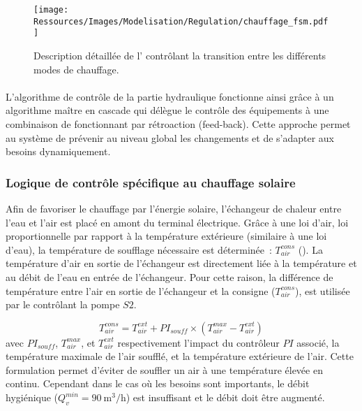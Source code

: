 \begin{figure}
    \centering
    \texttt{[image: Ressources/Images/Modelisation/Regulation/chauffage\_fsm.pdf]}
    \caption[ contrôlant la transition entre les différents modes de chauffage]
            {Description détaillée de l’ contrôlant la transition entre
             les différents modes de chauffage.}
    \label{fig:automate_chauffage}
\end{figure}


\paragraph{} %
\label{par:conclusion_algo}
L’algorithme de contrôle de la partie hydraulique fonctionne ainsi grâce à un algorithme
maître en cascade qui délègue le contrôle des équipements à une combinaison de
 fonctionnant par rétroaction (feed-back). Cette approche permet au système de
prévenir au niveau global les changements et de s’adapter aux besoins dynamiquement.


\subsubsection{Logique de contrôle spécifique au chauffage solaire} %
\label{ssub:logique_de_controle_specifique_au_chauffage_solaire}
Afin de favoriser le chauffage par l’énergie solaire, l’échangeur de chaleur entre l’eau
et l’air est placé en amont du terminal électrique. Grâce à une loi d’air, loi
proportionnelle par rapport à la température extérieure (similaire à une loi d’eau), la
température de soufflage nécessaire est déterminée~: $T_{air}^{cons}$ ().
La température d’air en sortie de l’échangeur est directement liée à la température et au
débit de l’eau en entrée de l’échangeur. Pour cette raison, la différence de température
entre l’air en sortie de l’échangeur et la consigne ($T_{air}^{cons}$), est utilisée
par le  contrôlant la pompe $S2$.

\begin{equation}\label{eq:temp_soufflage}
    T_{air}^{cons} = T_{air}^{ext} + PI_{souff} \times (T_{air}^{max} - T_{air}^{ext})
\end{equation}
avec $PI_{souff}$, $T_{air}^{max}$, et $T_{air}^{ext}$ respectivement l’impact du
contrôleur $PI$ associé, la température maximale de l’air soufflé, et la température
extérieure de l’air. Cette formulation permet d’éviter de souffler un air à une
température élevée en continu. Cependant dans le cas où les besoins sont importants, le
débit hygiénique ($Q_{v}^{min} = \SI[per-mode=symbol]{90}{\meter\cubed\per\hour}$) est insuffisant
et le débit doit être augmenté.

